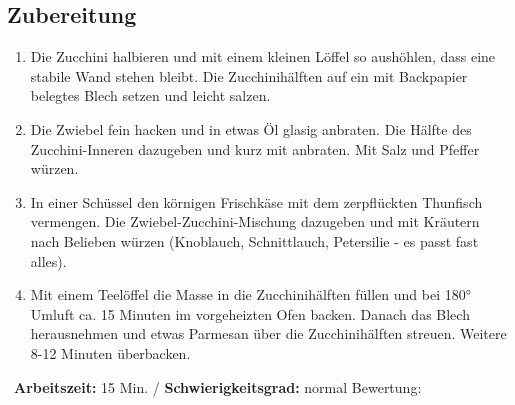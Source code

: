 \begin{minipage}[t]{0.58\textwidth}
\vspace{0pt}
\subsection*{Zubereitung}
\begin{enumerate}[leftmargin=*, itemindent=14pt]
\item Die Zucchini halbieren und mit einem kleinen Löffel so aushöhlen, dass eine stabile Wand stehen bleibt. Die Zucchinihälften auf ein mit Backpapier belegtes Blech setzen und leicht salzen. 

\item Die Zwiebel fein hacken und in etwas Öl glasig anbraten. Die Hälfte des Zucchini-Inneren dazugeben und kurz mit anbraten. Mit Salz und Pfeffer würzen. 

\item In einer Schüssel den körnigen Frischkäse mit dem zerpflückten Thunfisch vermengen. Die Zwiebel-Zucchini-Mischung dazugeben und mit Kräutern nach Belieben würzen (Knoblauch, Schnittlauch, Petersilie - es passt fast alles). 

\item Mit einem Teelöffel die Masse in die Zucchinihälften füllen und bei 180° Umluft ca. 15 Minuten im vorgeheizten Ofen backen. Danach das Blech herausnehmen und etwas Parmesan über die Zucchinihälften streuen. Weitere 8-12 Minuten überbacken.
\end{enumerate}
\end{minipage}
\vfill
\decothreeright \, \textbf{Arbeitszeit:} 15 Min. / \textbf{Schwierigkeitsgrad:} normal \decothreeleft \hfill Bewertung:  \Circle  \Circle \Circle \Circle  \Circle